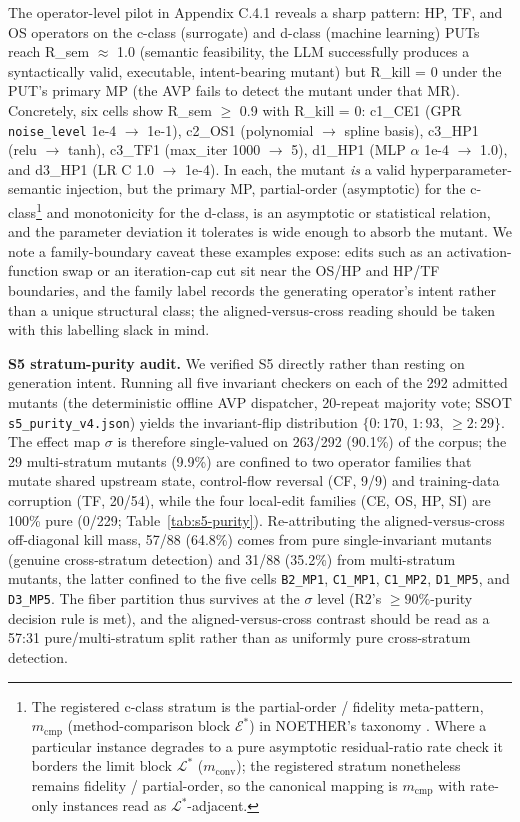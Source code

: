 \documentclass[manuscript,screen,review]{acmart}
\begin{document}
The operator-level pilot in Appendix C.4.1 reveals a sharp pattern: HP,
TF, and OS operators on the c-class (surrogate) and d-class (machine
learning) PUTs reach R\_sem $\approx$ 1.0 (semantic feasibility, the LLM
successfully produces a syntactically valid, executable, intent-bearing
mutant) but R\_kill = 0 under the PUT's primary MP (the AVP fails to
detect the mutant under that MR). Concretely, six cells show R\_sem $\geq$
0.9 with R\_kill = 0: c1\_CE1 (GPR \texttt{noise\_level} 1e-4 $\to$ 1e-1),
c2\_OS1 (polynomial $\to$ spline basis), c3\_HP1 (relu $\to$ tanh), c3\_TF1
(max\_iter 1000 $\to$ 5), d1\_HP1 (MLP $\alpha$ 1e-4 $\to$ 1.0), and d3\_HP1 (LR C 1.0
$\to$ 1e-4). In each, the mutant \emph{is} a valid hyperparameter-semantic
injection, but the primary MP, partial-order (asymptotic) for the
c-class\footnote{The registered c-class stratum is the partial-order /
fidelity meta-pattern, $m_{\mathrm{cmp}}$ (method-comparison block
$\mathcal{E}^{*}$) in NOETHER's taxonomy \citep{noether2026}. Where a
particular instance degrades to a pure asymptotic residual-ratio rate check
it borders the limit block $\mathcal{L}^{*}$ ($m_{\mathrm{conv}}$); the
registered stratum nonetheless remains fidelity / partial-order, so the
canonical mapping is $m_{\mathrm{cmp}}$ with rate-only instances read as
$\mathcal{L}^{*}$-adjacent.} and
monotonicity for the d-class, is an asymptotic or statistical relation,
and the parameter deviation it tolerates is wide enough to absorb the
mutant. We note a family-boundary caveat these examples expose: edits
such as an activation-function swap or an iteration-cap cut sit near
the OS/HP and HP/TF boundaries, and the family label records the
generating operator's intent rather than a unique structural class;
the aligned-versus-cross reading should be taken with this labelling
slack in mind.

\label{s5-audit}
\textbf{S5 stratum-purity audit.} We verified S5 directly rather than
resting on generation intent. Running all five invariant checkers on
each of the 292 admitted mutants (the deterministic offline AVP
dispatcher, 20-repeat majority vote; SSOT \texttt{s5\_purity\_v4.json})
yields the invariant-flip distribution $\{0{:}170,\,1{:}93,\,\ge 2{:}29\}$.
The effect map $\sigma$ is therefore single-valued on 263/292 (90.1\%) of
the corpus; the 29 multi-stratum mutants (9.9\%) are confined to two
operator families that mutate shared upstream state, control-flow
reversal (CF, 9/9) and training-data corruption (TF, 20/54), while the
four local-edit families (CE, OS, HP, SI) are 100\% pure (0/229;
Table~\ref{tab:s5-purity}). Re-attributing the aligned-versus-cross
off-diagonal kill mass, 57/88 (64.8\%) comes from pure single-invariant
mutants (genuine cross-stratum detection) and 31/88 (35.2\%) from
multi-stratum mutants, the latter confined to the five cells
\texttt{B2\_MP1}, \texttt{C1\_MP1}, \texttt{C1\_MP2}, \texttt{D1\_MP5},
and \texttt{D3\_MP5}. The fiber partition thus survives at the $\sigma$
level (R2's $\ge 90\%$-purity decision rule is met), and the
aligned-versus-cross contrast should be read as a 57:31 pure/multi-stratum
split rather than as uniformly pure cross-stratum detection.
\end{document}
